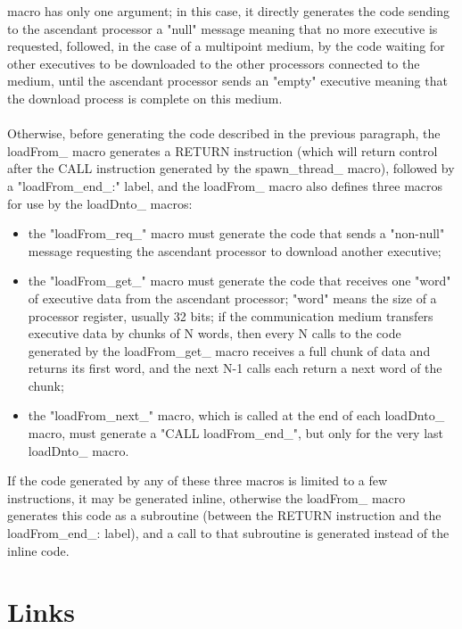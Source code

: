 \documentclass[11pt,twoside]{report}
\begin{document}
macro has only one argument; in this case, it directly generates the
code sending to the ascendant processor a "null" message meaning that no
more executive is requested, followed, in the case of a multipoint
medium, by the code waiting for other executives to be downloaded to the
other processors connected to the medium, until the ascendant processor
sends an "empty" executive meaning that the download process is complete
on this medium.\\\\
Otherwise, before generating the code described in the previous
paragraph, the loadFrom\_ macro generates a RETURN instruction (which
will return control after the CALL instruction generated by the
spawn\_thread\_ macro), followed by a "loadFrom\_end\_:" label, and the
loadFrom\_ macro also defines three macros for use by the loadDnto\_
macros:
\begin{itemize}
\item the "loadFrom\_req\_" macro must generate the code that sends a
  "non-null" message requesting the ascendant processor to download
  another executive;
\item the "loadFrom\_get\_" macro must generate the code that receives
  one "word" of executive data from the ascendant processor; "word"
  means the size of a processor register, usually 32 bits; if the
  communication medium transfers executive data by chunks of N words,
  then every N calls to the code generated by the loadFrom\_get\_ macro
  receives a full chunk of data and returns its first word, and the next
  N-1 calls each return a next word of the chunk;
\item the "loadFrom\_next\_" macro, which is called at the end of each
  loadDnto\_ macro, must generate a "CALL loadFrom\_end\_", but only for
  the very last loadDnto\_ macro.
\end{itemize}
If the code generated by any of these three macros is limited to a few
instructions, it may be generated inline, otherwise the loadFrom\_ macro
generates this code as a subroutine (between the RETURN instruction and
the loadFrom\_end\_: label), and a call to that subroutine is generated
instead of the inline code.

\chapter{Links}
\\\\
\\
\\
\\
\\
\end{document}
